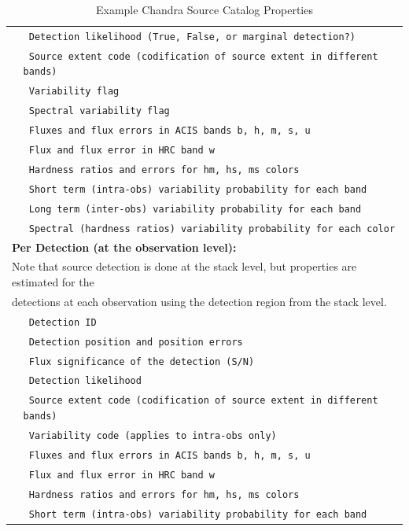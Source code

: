 \documentclass[11pt,a4paper]{ivoa}
\begin{document}
\begin{table}[ht!]
\begin{tabular}{|p{0.4cm}p{10.0cm}|}
    & \texttt{ Detection likelihood (True, False, or marginal detection?) } \\
    & \texttt{ Source extent code (codification of source extent in different bands) } \\
    & \texttt{ Variability flag } \\
    & \texttt{ Spectral variability flag } \\
    & \texttt{ Fluxes and flux errors in ACIS bands b, h, m, s, u } \\
    & \texttt{ Flux and flux error in  HRC band w } \\
    & \texttt{ Hardness ratios and errors for hm, hs, ms colors } \\
    & \texttt{ Short term (intra-obs) variability probability for each band } \\
    & \texttt{ Long term (inter-obs) variability probability for each band } \\
    & \texttt{ Spectral (hardness ratios) variability probability for each color } \\
    \hline
    \multicolumn{2}{|l|}{\textbf{Per Detection (at the observation level):}} \\
    \multicolumn{2}{|l|}{ Note that source detection is done at the stack level, but properties are estimated for the } \\
    \multicolumn{2}{|l|}{detections at each observation using the detection region from the stack level.} \\
    & \texttt{ Detection ID } \\
    & \texttt{ Detection position and position errors } \\
    & \texttt{ Flux significance of the detection (S/N) } \\
    & \texttt{ Detection likelihood } \\
    & \texttt{ Source extent code (codification of source extent in different bands) } \\
    & \texttt{ Variability code (applies to intra-obs only) } \\
    & \texttt{ Fluxes and flux errors in ACIS bands b, h, m, s, u } \\
    & \texttt{ Flux and flux error in  HRC band w } \\
    & \texttt{ Hardness ratios and errors for hm, hs, ms colors } \\
    & \texttt{ Short term (intra-obs) variability probability for each band } \\
    \hline

  \end{tabular}
  \caption{ Example Chandra Source Catalog Properties }
  \label{tab:chandra_props}

 \end{table}
 
\end{document}
